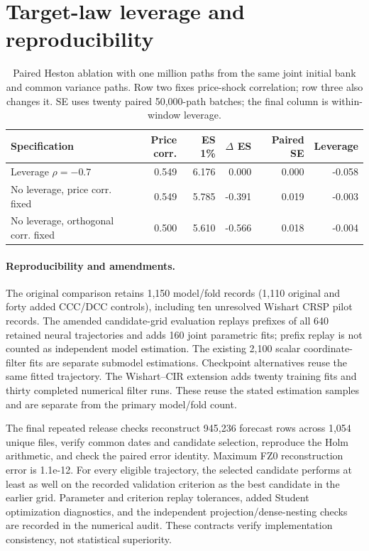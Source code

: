 \documentclass[11pt]{article}
\theoremstyle{definition}\newtheorem{definition}[theorem]{Definition}
\theoremstyle{remark}\newtheorem{remark}[theorem]{Remark}
\begin{document}
\FloatBarrier
\section{Target-law leverage and reproducibility}
\begin{table}[htbp]
\centering\footnotesize
\setlength{\tabcolsep}{4pt}
\begin{tabular}{lrrrrr}
\toprule
Specification & Price corr. & ES 1\% & $\Delta$ ES & Paired SE & Leverage \\
\midrule
Leverage $\rho=-0.7$ & 0.549 & 6.176 & 0.000 & 0.000 & -0.058 \\
No leverage, price corr. fixed & 0.549 & 5.785 & -0.391 & 0.019 & -0.003 \\
No leverage, orthogonal corr. fixed & 0.500 & 5.610 & -0.566 & 0.018 & -0.004 \\
\bottomrule
\end{tabular}
\caption{Paired Heston ablation with one million paths from the same joint initial bank and common variance paths. Row two fixes price-shock correlation; row three also changes it. SE uses twenty paired 50,000-path batches; the final column is within-window leverage.}\label{tab:leverage-ablation}
\end{table}

\paragraph{Reproducibility and amendments.}
The original comparison retains 1,150 model/fold records (1,110 original and forty added CCC/DCC controls), including ten unresolved Wishart CRSP pilot records. The amended candidate-grid evaluation replays prefixes of all 640 retained neural trajectories and adds 160 joint parametric fits; prefix replay is not counted as independent model estimation. The existing 2,100 scalar coordinate-filter fits are separate submodel estimations. Checkpoint alternatives reuse the same fitted trajectory. The Wishart--CIR extension adds twenty training fits and thirty completed numerical filter runs. These reuse the stated estimation samples and are separate from the primary model/fold count.

The final repeated release checks reconstruct 945,236 forecast rows across 1,054 unique files, verify common dates and candidate selection, reproduce the Holm arithmetic, and check the paired error identity. Maximum FZ0 reconstruction error is 1.1e-12. For every eligible trajectory, the selected candidate performs at least as well on the recorded validation criterion as the best candidate in the earlier grid. Parameter and criterion replay tolerances, added Student optimization diagnostics, and the independent projection/dense-nesting checks are recorded in the numerical audit. These contracts verify implementation consistency, not statistical superiority.
\end{document}
